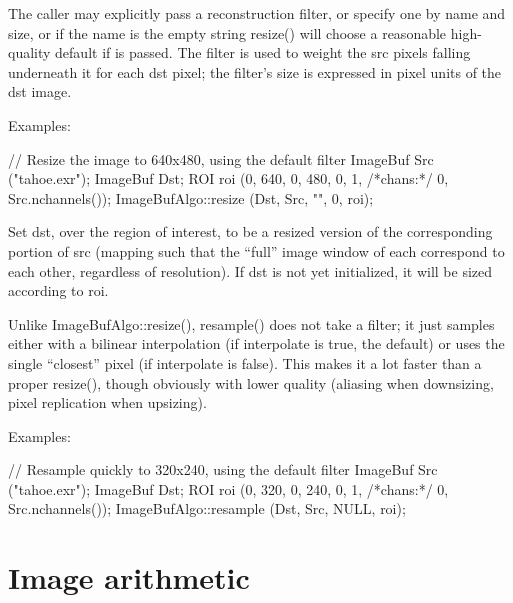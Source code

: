 The caller may explicitly pass a reconstruction filter, or specify one by
name and size, or if the name is the empty string {\cf resize()} will choose
a reasonable high-quality default if \NULL is passed.  The filter is used to
weight the {\cf src} pixels falling underneath it for each {\cf dst} pixel;
the filter's size is expressed in pixel units of the {\cf dst} image.

\smallskip
\noindent Examples:
\begin{code}
    // Resize the image to 640x480, using the default filter
    ImageBuf Src ("tahoe.exr");
    ImageBuf Dst;
    ROI roi (0, 640, 0, 480, 0, 1, /*chans:*/ 0, Src.nchannels());
    ImageBufAlgo::resize (Dst, Src, "", 0, roi);
\end{code}
\apiend


 
Set {\cf dst}, over the region of interest, to be a resized version of the
corresponding portion of {\cf src} (mapping such that the ``full'' image
window of each correspond to each other, regardless of resolution).  If
{\cf dst} is not yet initialized, it will be sized according to {\cf roi}.

Unlike {\cf ImageBufAlgo::resize()}, {\cf resample()} does not take a filter; it
just samples either with a bilinear interpolation (if {\cf interpolate} is
{\cf true}, the default) or uses the single ``closest'' pixel (if
{\cf interpolate} is {\cf false}).  This makes it a lot faster than a proper
{\cf resize()}, though obviously with lower quality (aliasing when
downsizing, pixel replication when upsizing).

\smallskip
\noindent Examples:
\begin{code}
    // Resample quickly to 320x240, using the default filter
    ImageBuf Src ("tahoe.exr");
    ImageBuf Dst;
    ROI roi (0, 320, 0, 240, 0, 1, /*chans:*/ 0, Src.nchannels());
    ImageBufAlgo::resample (Dst, Src, NULL, roi);
\end{code}
\apiend



\section{Image arithmetic}
\label{sec:iba:arith}

